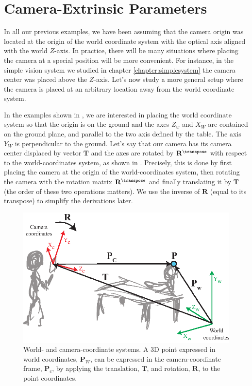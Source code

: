 \section{Camera-Extrinsic Parameters}

In all our previous examples, we have been assuming that the camera origin was located at the origin of the world coordinate system with the optical axis aligned with the world $Z$-axis. In practice, there will be many situations where placing the camera at a special position will be more convenient. For instance, in the simple vision system we studied in chapter \ref{chapter:simplesystem} the camera center was placed above the $Z$-axis. Let's now study a more general setup where the camera is placed at an arbitrary location away from the world coordinate system. 

In the examples shown in \fig{\ref{fig:camera_calibration}}, we are interested in placing the world coordinate system so that the origin is on the ground and the axes $Z_w$ and $X_W$ are contained on the ground plane, and parallel to the two axis defined by the table. The axis $Y_W$ is perpendicular to the ground. Let's say that our camera has its camera center displaced by vector $\mathbf{T}$ and the axes are rotated by $\mathbf{R}^\transpose$ with respect to the world-coordinates system, as shown in \fig{\ref{fig:camera_calibration}}. Precisely, this is done by first placing the camera at the origin of the world-coordinates system, then rotating the camera with the rotation matrix $\mathbf{R}^\transpose$ and finally translating it by $\mathbf{T}$ (the order of these two operations matters). We use the inverse of $\mathbf{R}$ (equal to its transpose) to simplify the derivations later. 



\begin{figure}[t]
\centerline{
\includegraphics[width=0.7\linewidth]{figures/imaging_geometry/world_and_camera_coordinates_2.eps}
}
\caption{World- and camera-coordinate systems. A 3D point expressed in world coordinates, $\mathbf{P}_W$, can be expressed in the camera-coordinate frame, $\mathbf{P}_c$, by applying the translation, $\mathbf{T}$, and rotation, $\mathbf{R}$, to the point coordinates.}
\label{fig:camera_calibration}
\end{figure}

